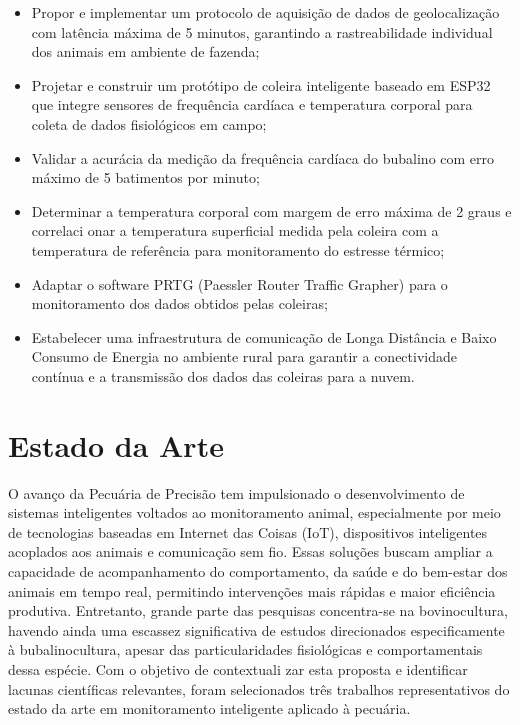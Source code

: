\documentclass[11pt,a4paper]{article}
\begin{document}
\begin{itemize}
    \item  Propor e implementar um protocolo de aquisição de dados de geolocalização com latência
máxima de 5 minutos, garantindo a rastreabilidade individual dos animais em ambiente
de fazenda;
    \item  Projetar e construir um protótipo de coleira inteligente baseado em ESP32 que integre
sensores de frequência cardíaca e temperatura corporal para coleta de dados fisiológicos
em campo;
    \item  Validar a acurácia da medição da frequência cardíaca do bubalino com erro máximo de 5
batimentos por minuto;
    \item  Determinar a temperatura corporal com margem de erro máxima de 2 graus e correlaci
onar a temperatura superficial medida pela coleira com a temperatura de referência para
monitoramento do estresse térmico;
    \item Adaptar o software PRTG (Paessler Router Traffic Grapher) para o monitoramento dos
dados obtidos pelas coleiras;
    \item Estabelecer uma infraestrutura de comunicação de Longa Distância e Baixo Consumo de
Energia no ambiente rural para garantir a conectividade contínua e a transmissão dos
dados das coleiras para a nuvem.
\end{itemize}

\section{Estado da Arte}

O avanço da Pecuária de Precisão tem impulsionado o desenvolvimento de sistemas inteligentes
voltados ao monitoramento animal, especialmente por meio de tecnologias baseadas em Internet
das Coisas (IoT), dispositivos inteligentes acoplados aos animais e comunicação sem fio. Essas
soluções buscam ampliar a capacidade de acompanhamento do comportamento, da saúde e do
bem-estar dos animais em tempo real, permitindo intervenções mais rápidas e maior eficiência
produtiva. Entretanto, grande parte das pesquisas concentra-se na bovinocultura, havendo ainda
uma escassez significativa de estudos direcionados especificamente à bubalinocultura, apesar das
particularidades fisiológicas e comportamentais dessa espécie. Com o objetivo de contextuali
zar esta proposta e identificar lacunas científicas relevantes, foram selecionados três trabalhos
representativos do estado da arte em monitoramento inteligente aplicado à pecuária.
\end{document}
